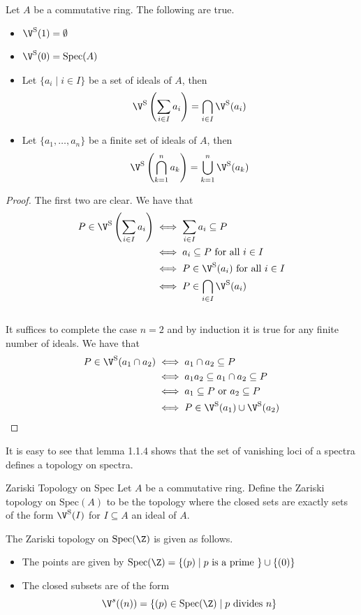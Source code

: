 \documentclass[a4paper]{article}
\begin{document}
\begin{lmm}{}{} Let $A$ be a commutative ring. The following are true. 
\begin{itemize}
\item $\V^\text{S}(1)=\emptyset$
\item $\V^\text{S}(0)=\text{Spec}(A)$
\item Let $\{a_i\;|\;i\in I\}$ be a set of ideals of $A$, then $$\V^\text{S}\left(\sum_{i\in I}a_i\right)=\bigcap_{i\in I}\V^\text{S}(a_i)$$
\item Let $\{a_1,\dots,a_n\}$ be a finite set of ideals of $A$, then $$\V^\text{S}\left(\bigcap_{k=1}^na_k\right)=\bigcup_{k=1}^n\V^\text{S}(a_k)$$
\end{itemize}
\begin{proof}
The first two are clear. We have that 
\begin{align*}
P\in\V^\text{S}\left(\sum_{i\in I}a_i\right)&\iff\sum_{i\in I}a_i\subseteq P\\
&\iff a_i\subseteq P\text{ for all }i\in I\\
&\iff P\in\V^\text{S}(a_i)\text{ for all }i\in I\\
&\iff P\in\bigcap_{i\in I}\V^\text{S}(a_i)
\end{align*}~\\

It suffices to complete the case $n=2$ and by induction it is true for any finite number of ideals. 
We have that 
\begin{align*}
P\in\V^\text{S}(a_1\cap a_2)&\iff a_1\cap a_2\subseteq P\\
&\iff a_1a_2\subseteq a_1\cap a_2\subseteq P\\
&\iff a_1\subseteq P\text{ or }a_2\subseteq P\\
&\iff P\in\V^\text{S}(a_1)\cup\V^\text{S}(a_2)
\end{align*}
\end{proof}
\end{lmm}
It is easy to see that lemma 1.1.4 shows that the set of vanishing loci of a spectra defines a topology on spectra. 

\begin{defn}{Zariski Topology on Spec}{} Let $A$ be a commutative ring. Define the Zariski topology on $\text{Spec}(A)$ to be the topology where the closed sets are exactly sets of the form $\V^\text{S}(I)$ for $I\subseteq A$ an ideal of $A$. 
\end{defn}

\begin{eg}{}{} The Zariski topology on $\text{Spec}(\Z)$ is given as follows. 
\begin{itemize}
\item The points are given by $\text{Spec}(\Z)=\{(p)\;|\;p\text{ is a prime }\}\cup\{(0)\}$
\item The closed subsets are of the form $$\V^s((n))=\{(p)\in\text{Spec}(\Z)\;|\;p\text{ divides }n\}$$
\end{itemize}
\end{eg}
\end{document}

